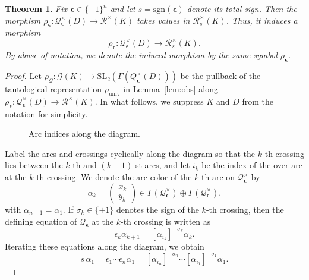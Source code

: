 \documentclass[12pt,reqno]{amsart}
\newcommand{\calQ}{\mathcal{Q}}
\newcommand{\calG}{\mathcal{G}}
\newcommand{\calR}{\mathcal{R}}
\newcommand{\sgn}{\mathrm{sgn}}
\newcommand{\SL}{\mathrm{SL}}
\newtheorem{theorem}{Theorem}[section]
\theoremstyle{definition}
\begin{document}
	
	\begin{theorem} \label{thm:obs}
		Fix $\boldsymbol{\epsilon}\in\{\pm1\}^n$ and let $s=\sgn(\boldsymbol{\epsilon})$ denote its total sign. Then  the morphism $\rho_{\boldsymbol{\epsilon}} : \calQ_{\boldsymbol{\epsilon}}^\times(D) \rightarrow	\calR^\times(K)$ takes values in $\calR_s^\times(K)$. Thus, it induces a morphism
		\begin{equation} \label{eqn:rhoe}
			\rho_{\boldsymbol{\epsilon}} : \calQ_{\boldsymbol{\epsilon}}^\times(D) \longrightarrow \calR_s^\times(K).
		\end{equation}
		By abuse of notation, we denote the induced morphism by the same symbol $\rho_{\boldsymbol{\epsilon}}$.
	\end{theorem}
	\begin{proof}
		Let $ \rho_\calQ : \calG(K) \rightarrow \SL_2(\Gamma(Q_{\boldsymbol{\epsilon}}^\times(D)))$ be the pullback of the tautological representation $\rho_\mathrm{univ}$ in Lemma~\ref{lem:obs} along $\rho_{\boldsymbol{\epsilon}}:\calQ_{\boldsymbol{\epsilon}}^\times(D) \rightarrow \calR^\times(K)$. In what follows, we suppress $K$ and $D$ from the notation for simplicity.
		
		\begin{figure}[!h]
			\centering
			\scalebox{1}{}
			\caption{Arc indices along the diagram.}
			\label{fig:indexalong}
		\end{figure}
		
		Label the arcs and crossings cyclically along the diagram so that the $k$-th crossing lies between the $k$-th and $(k+1)$-st arcs, and let $i_k$ be the index of the over-arc at the $k$-th crossing. We denote the arc-color of the $k$-th arc on $\calQ_{\boldsymbol{\epsilon}}^\times$ by
		\[
		\alpha_k= 
        \begin{pmatrix}
			x_k\\
			y_k
		\end{pmatrix} \in
		\Gamma(\calQ_{\boldsymbol{\epsilon}}^\times) \oplus \Gamma(\calQ_{\boldsymbol{\epsilon}}^\times).
		\]
		with $\alpha_{n+1}=\alpha_1$. If $\sigma_k\in\{\pm1\}$ denotes the sign of the $k$-th crossing, then the defining equation of $\calQ_{\boldsymbol{\epsilon}}$ at the $k$-th crossing is written as
		\[
		      \epsilon_k\alpha_{k+1} = [\alpha_{i_k}]^{-\sigma_k}\alpha_k.
		\]
		Iterating these equations along the diagram, we obtain
		\[
		      s \, \alpha_1 = \epsilon_1 \cdots \epsilon_n  \alpha_1 = [\alpha_{i_n}]^{-\sigma_n}\cdots [\alpha_{i_1}]^{-\sigma_1}\alpha_1.
		\]
		

\end{proof}
\end{document}

